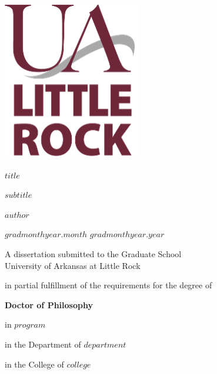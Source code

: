 \documentclass[$if(font_size)$$font_size$$else$12pt$endif$]{book}
\newcommand{\thesistitle}{$title$}
\newcommand{\thesistitle}{[Title Placeholder]}
\newcommand{\secondtitle}{$subtitle$}
\newcommand{\secondtitle}{[Subtitle Placeholder]}
\newcommand{\authorname}{$author$}
\newcommand{\authorname}{[Author Placeholder]}
\newcommand{\degree}{Doctor of Philosophy}
\newcommand{\submissiontype}{dissertation}
\newcommand{\degree}{Master of Arts}
\newcommand{\submissiontype}{thesis}
\newcommand{\degree}{Master of Science}
\newcommand{\submissiontype}{thesis}
\newcommand{\degree}{[Degree Placeholder]}
\newcommand{\submissiontype}{[Submission Type Placeholder]}
\newcommand{\program}{$program$}
\newcommand{\program}{[Program Placeholder]}
\newcommand{\department}{$department$}
\newcommand{\department}{[Department Placeholder]}
\newcommand{\college}{$college$}
\newcommand{\college}{[College Placeholder]}
\newcommand{\gradmonth}{$gradmonthyear.month$}
\newcommand{\gradmonth}{[Month]}
\newcommand{\gradyear}{$gradmonthyear.year$}
\newcommand{\gradyear}{[Year]}
\begin{document}
\begin{titlepage}
    \begin{flushleft}
        \includegraphics{img/ua-little-rock.png}
    \end{flushleft}
    \begin{flushleft}
        \vspace{.5cm}
        {\Large\bfseries\sffamily \thesistitle \par}
        {\Large\bfseries\sffamily \secondtitle \par}
        \vspace{1cm}
        {\normalsize\bfseries\sffamily \authorname \par}
        {\normalsize \gradmonth{} \gradyear \par}
        \vspace{1cm}
        {\normalsize A \submissiontype{} submitted to the Graduate School \\ University of Arkansas at Little Rock \par}
        \vspace {1cm}
        {\normalsize in partial fulfillment of the requirements for the degree of \par}
        {\normalsize\bfseries\sffamily \degree \par}
        {\normalsize in \program \par}
        \vspace {1cm}
        {\normalsize in the Department of \department \par}
        {\normalsize in the College of \college \par}
        \hrulefill \\
        \vspace{0.5cm}
        {\normalsize\bfseries{} \par}

\end{flushleft}
\end{titlepage}
\end{document}
